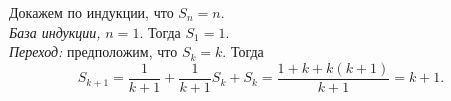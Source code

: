 \documentclass{article}
\begin{document}
Докажем по индукции, что $S_n = n$.\\
\textit{База индукции,} $n=1$. Тогда $S_1 = 1$.\\
\textit{Переход:} предположим, что $S_k = k$. Тогда
$$S_{k+1} = \frac{1}{k+1} + \frac{1}{k+1} S_k + S_k = \frac{1 + k + k(k+1)}{k+1} = k+1.$$
\end{document}
